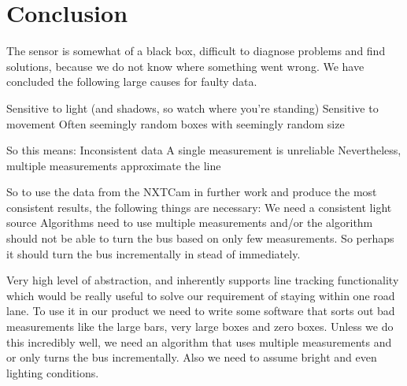 


\section{Conclusion}

The sensor is somewhat of a black box, difficult to diagnose problems and find solutions, because we do not know where something went wrong. We have concluded the following large causes for faulty data. 

Sensitive to light (and shadows, so watch where you're standing)
Sensitive to movement
Often seemingly random boxes with seemingly random size

So this means:
Inconsistent data
A single measurement is unreliable
Nevertheless, multiple measurements approximate the line 

So to use the data from the NXTCam in further work and produce the most consistent results, the following things are necessary: 
We need a consistent light source 
Algorithms need to use multiple measurements and/or the algorithm should not be able to turn the bus based on only few measurements. So perhaps it should turn the bus incrementally in stead of immediately. 



Very high level of abstraction, and inherently supports line tracking functionality which would be really useful to solve our requirement of staying within one road lane. To use it in our product we need to write some software that sorts out bad measurements like the large bars, very large boxes and zero boxes. 
Unless we do this incredibly well, we need an algorithm that uses multiple measurements and or only turns the bus incrementally. 
Also we need to assume bright and even lighting conditions.